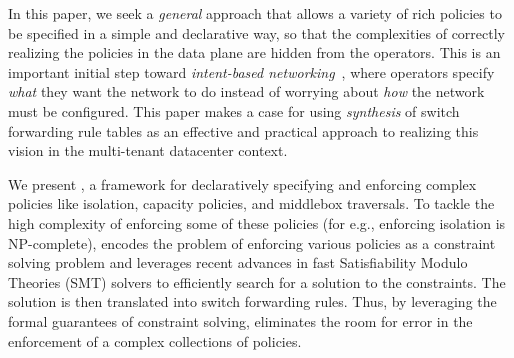 In this paper, we seek a {\em general} approach that allows a variety
of rich policies to be specified in a simple and declarative way, so
that the complexities of correctly realizing the policies in the data
plane are hidden from the operators. This is an important
initial step toward {\em intent-based networking}~\cite{intent}, where
operators specify {\em what} they want the network to do instead of
worrying about {\em how} the network must be configured.
This paper makes a case for using \emph{synthesis} of switch
forwarding rule tables as an effective and practical approach to realizing
this vision in the multi-tenant datacenter context.

We present \Name, a framework for declaratively specifying and
enforcing complex policies 
like isolation, capacity policies, and middlebox
traversals. To tackle the high complexity of enforcing
some of these policies (for e.g., enforcing isolation
is NP-complete),
\Name 
encodes the problem of enforcing various
policies as a constraint solving problem and
leverages recent advances in
fast Satisfiability Modulo Theories (SMT) solvers
to efficiently search for a solution to the constraints. 
The solution is then translated into switch forwarding rules. 
Thus, by leveraging the formal guarantees of constraint solving, \Name
eliminates the room for error in the enforcement of 
a complex collections of policies. 


